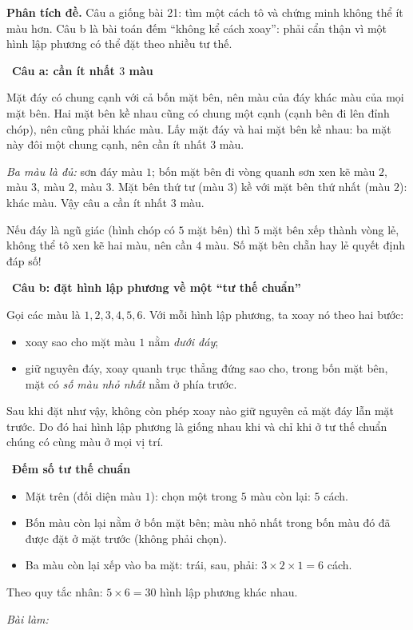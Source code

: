 \documentclass[11pt]{article}
\newif\ifsol \solfalse
\newcommand{\probsol}[1]{%
  \begin{lrbox}{\solmeasure}\begin{minipage}{\dimexpr\linewidth-24pt\relax}#1\end{minipage}\end{lrbox}%
  \ifsol
    \begin{solbox}#1\end{solbox}%
  \else
    \setlength{\solht}{\dimexpr\ht\solmeasure+\dp\solmeasure+0.85cm\relax}%
    \ifdim\solht<1.35cm\setlength{\solht}{1.35cm}\fi
    \ifdim\solht>\StudentMaxWork\setlength{\solht}{\StudentMaxWork}\fi
    \begin{tcolorbox}[colback=white,colframe=Line,boxrule=0.8pt,arc=5pt,
      left=8pt,right=8pt,top=4pt,bottom=4pt,height=\solht]{\footnotesize\color{Slate}\itshape\WorkWord}\end{tcolorbox}%
  \fi}
\newlength{\StudentMaxWork}\setlength{\StudentMaxWork}{7.5cm}
\newcommand{\step}[2]{\par\smallskip\noindent{\bfseries\color{tmBlue!85!black}\StepWord~#1.}\ {\bfseries #2}\par\nopagebreak}
\def\WorkWord{Bài làm:}
\def\StepWord{Bước}
\begin{document}
\probsol{
\textbf{Phân tích đề.} Câu a giống bài 21: tìm một cách tô và chứng minh không thể ít màu hơn. Câu b là bài toán đếm ``không kể
cách xoay'': phải cẩn thận vì một hình lập phương có thể đặt theo nhiều tư thế.

\step{1}{Câu a: cần ít nhất $3$ màu}
\begin{proofbox}Mặt đáy có chung cạnh với cả bốn mặt bên, nên màu của đáy khác màu của mọi mặt bên. Hai mặt bên kề nhau cũng có chung
một cạnh (cạnh bên đi lên đỉnh chóp), nên cũng phải khác màu. Lấy mặt đáy và hai mặt bên kề nhau: ba mặt này đôi một chung cạnh,
nên cần ít nhất $3$ màu.\end{proofbox}
\emph{Ba màu là đủ:} sơn đáy màu $1$; bốn mặt bên đi vòng quanh sơn xen kẽ màu $2$, màu $3$, màu $2$, màu $3$. Mặt bên thứ tư (màu $3$)
kề với mặt bên thứ nhất (màu $2$): khác màu. Vậy câu a cần ít nhất $3$ màu.
\begin{tipbox}Nếu đáy là ngũ giác (hình chóp có $5$ mặt bên) thì $5$ mặt bên xếp thành vòng lẻ, không thể tô xen kẽ hai màu,
nên cần $4$ màu. Số mặt bên chẵn hay lẻ quyết định đáp số!\end{tipbox}

\step{2}{Câu b: đặt hình lập phương về một ``tư thế chuẩn''}
Gọi các màu là $1,2,3,4,5,6$. Với mỗi hình lập phương, ta xoay nó theo hai bước:
\begin{itemize}[leftmargin=1.2em,itemsep=1pt,topsep=2pt]
\item xoay sao cho mặt màu $1$ nằm \emph{dưới đáy};
\item giữ nguyên đáy, xoay quanh trục thẳng đứng sao cho, trong bốn mặt bên, mặt có \emph{số màu nhỏ nhất} nằm ở phía trước.
\end{itemize}
Sau khi đặt như vậy, không còn phép xoay nào giữ nguyên cả mặt đáy lẫn mặt trước. Do đó hai hình lập phương là giống nhau khi và
chỉ khi ở tư thế chuẩn chúng có cùng màu ở mọi vị trí.

\step{3}{Đếm số tư thế chuẩn}
\begin{itemize}[leftmargin=1.2em,itemsep=1pt,topsep=2pt]
\item Mặt trên (đối diện màu $1$): chọn một trong $5$ màu còn lại: $5$ cách.
\item Bốn màu còn lại nằm ở bốn mặt bên; màu nhỏ nhất trong bốn màu đó đã được đặt ở mặt trước (không phải chọn).
\item Ba màu còn lại xếp vào ba mặt: trái, sau, phải: $3\times2\times1=6$ cách.
\end{itemize}
Theo quy tắc nhân: $5\times6=30$ hình lập phương khác nhau.

}
\end{document}
